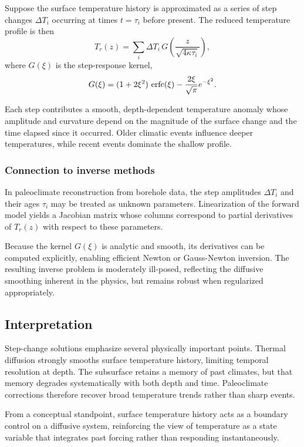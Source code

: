 Suppose the surface temperature history is approximated as a series of step changes $\Delta T_i$ occurring at times $t = \tau_i$ before present. The reduced temperature profile is then
\begin{equation}
    T_r(z) = \sum_i \Delta T_i \, G\!\left( \frac{z}{\sqrt{4\kappa \tau_i}} \right),
\end{equation}
where $G(\xi)$ is the step-response kernel,
\begin{equation}
    G(\xi) =
    (1 + 2\xi^2)\,\operatorname{erfc} (\xi) - \frac{2\xi}{\sqrt{\pi}} e^{-\xi^2}.
\end{equation}

Each step contributes a smooth, depth-dependent temperature anomaly whose amplitude and curvature depend on the magnitude of the surface change and the time elapsed since it occurred. Older climatic events influence deeper temperatures, while recent events dominate the shallow profile.

\subsubsection*{Connection to inverse methods}

In paleoclimate reconstruction from borehole data, the step amplitudes $\Delta T_i$ and their ages $\tau_i$ may be treated as unknown parameters. Linearization of the forward model yields a Jacobian matrix whose columns correspond to partial derivatives of $T_r(z)$ with respect to these parameters.

Because the kernel $G(\xi)$ is analytic and smooth, its derivatives can be computed explicitly, enabling efficient Newton or Gauss-Newton inversion. The resulting inverse problem is moderately ill-posed, reflecting the diffusive smoothing inherent in the physics, but remains robust when regularized appropriately.

\subsection{Interpretation}

Step-change solutions emphasize several physically important points. Thermal diffusion strongly smooths surface temperature history, limiting temporal resolution at depth.  The subsurface retains a memory of past climates, but that memory degrades systematically with both depth and time. Paleoclimate corrections therefore recover broad temperature trends rather than sharp events.

From a conceptual standpoint, surface temperature history acts as a boundary control on a diffusive system, reinforcing the view of temperature as a state variable that integrates past forcing rather than responding instantaneously.

